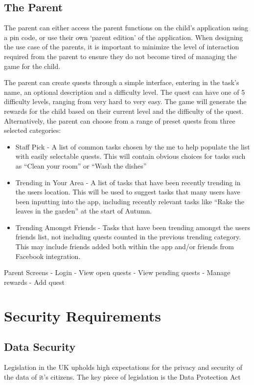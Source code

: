 \subsection{The Parent}
The parent can either access the parent functions on the child's application using a pin code, or use their own `parent edition' of the application. 
When designing the use case of the parents, it is important to minimize the level of interaction required from the parent to ensure they do not become tired of managing the game for the child.

The parent can create quests through a simple interface, entering in the task's name, an optional description and a difficulty level. 
The quest can have one of 5 difficulty levels, ranging from very hard to very easy.
The game will generate the rewards for the child based on their current level and the difficulty of the quest.
Alternatively, the parent can choose from a range of preset quests from three selected categories:
\begin{itemize}
	\item 
		Staff Pick - A list of common tasks chosen by the me to help populate the list with easily selectable quests. 
		This will contain obvious choices for tasks such as ``Clean your room'' or ``Wash the dishes''
	\item
		Trending in Your Area - A list of tasks that have been recently trending in the users location. 
		This will be used to suggest tasks that many users have been inputting into the app, including recently relevant tasks like ``Rake the leaves in the garden'' at the start of Autumn.
	\item 
		Trending Amongst Friends - Tasks that have been trending amongst the users friends list, not including quests counted in the previous 	trending category. 
		This may include friends added both within the app and/or friends from Facebook integration.  
\end{itemize}

Parent Screens
- Login
- View open quests
- View pending quests
- Manage rewards
- Add quest

\section{Security Requirements}

\subsection{Data Security}
Legislation in the UK upholds high expectations for the privacy and security of the data of it's citizens. 
The key piece of legislation is the Data Protection Act \citep{britain_data_1984}

